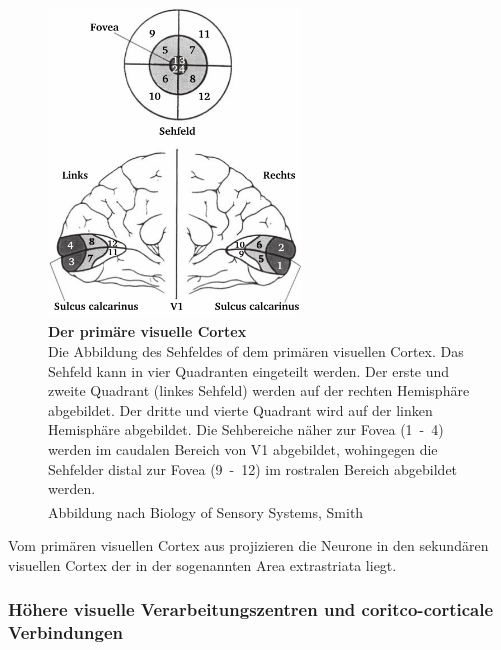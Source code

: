 \documentclass[12pt,a4paper,pdftex]{article}
\begin{document}
\begin{figure}[H]
    \centering
    \includegraphics[width = 0.6\textwidth]{pictures/visual/V1.png}
    \caption[Der primäre visuelle Cortex]{\textbf{Der primäre visuelle Cortex}\\
    Die Abbildung des Sehfeldes of dem primären visuellen Cortex. Das Sehfeld kann in vier Quadranten eingeteilt werden. Der erste und zweite Quadrant (linkes Sehfeld) werden auf der rechten Hemisphäre abgebildet. Der dritte und vierte Quadrant wird auf der linken Hemisphäre abgebildet. Die Sehbereiche näher zur Fovea (1~-~4) werden im caudalen Bereich von V1 abgebildet, wohingegen die Sehfelder distal zur Fovea (9~-~12) im rostralen Bereich abgebildet werden.\\
    Abbildung nach Biology of Sensory Systems, Smith \textsuperscript{\cite[18]{smith2008biology}}}
    \label{fig:V1}
\end{figure}

Vom primären visuellen Cortex aus projizieren die Neurone in den sekundären visuellen Cortex der in der sogenannten Area extrastriata liegt. 

\subsubsection*{Höhere visuelle Verarbeitungszentren und coritco-corticale Verbindungen}
\end{document}
